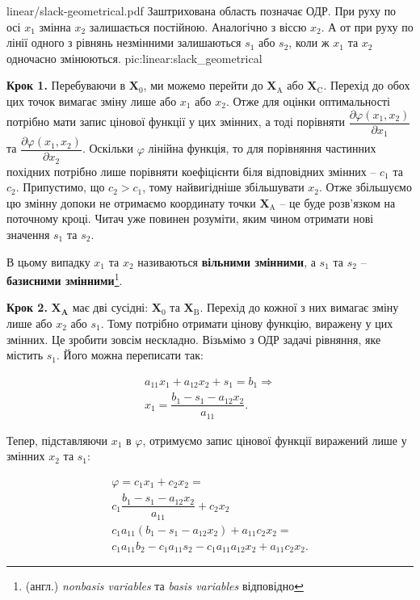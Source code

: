 \documentclass[\main/book.tex]{subfiles}
\begin{document}
\illustration
 {linear/slack-geometrical.pdf}
 {Заштрихована область позначає ОДР. При руху по осі $x_1$ змінна $x_2$ залишається постійною. Аналогічно з віссю $x_2$. А от при руху по лінії одного з рівнянь незмінними залишаються $s_1$ або $s_2$, коли ж $x_1$ та $x_2$ одночасно змінюються.}
 {pic:linear:slack_geometrical}

\textbf{Крок 1.} \quad Перебуваючи в $\mathbf{X}_0$, ми можемо перейти до $\mathbf{X}_\mathrm{A}$ або $\mathbf{X}_\mathrm{C}$. Перехід до обох цих точок вимагає зміну лише або $x_1$ або $x_2$. Отже для оцінки оптимальності потрібно мати запис цінової функції у цих змінних, а тоді порівняти $\dfrac{\partial \varphi(x_1, x_2)}{\partial x_1}$ та $\dfrac{\partial \varphi(x_1, x_2)}{\partial x_2}$. Оскільки $\varphi$ лінійна функція, то для порівняння частинних похідних потрібно лише порівняти коефіцієнти біля відповідних змінних -- $c_1$ та $c_2$. Припустимо, що $c_2 > c_1$, тому найвигідніше збільшувати $x_2$. Отже збільшуємо цю змінну допоки не отримаємо координату точки $\mathbf{X}_\mathrm{A}$ -- це буде розв'язком на поточному кроці. Читач уже повинен розуміти, яким чином отримати нові значення $s_1$ та $s_2$.

В цьому випадку $x_1$ та $x_2$ називаються \textbf{вільними змінними}, а $s_1$ та $s_2$ -- \textbf{базисними змінними}\footnote{(англ.) \textit{nonbasis variables} та \textit{basis variables} відповідно}.

\textbf{Крок 2.}  $\mathbf{X}_\mathbf{A}$ має дві сусідні: $\mathbf{X}_0$ та $\mathbf{X}_\mathrm{B}$. Перехід до кожної з них вимагає зміну лише або $x_2$ або $s_1$. Тому потрібно отримати цінову функцію, виражену у цих змінних. Це зробити зовсім нескладно. Візьмімо з ОДР задачі рівняння, яке містить $s_1$. Його можна переписати так:
 
 \[
 \begin{split}
  a_{11} x_1 + a_{12} x_2 + s_1 = b_1 \Rightarrow \\
  x_1 = \dfrac{b_1 - s_1 - a_{12} x_2}{a_{11}}.
 \end{split}
 \]
 
Тепер, підставляючи $x_1$ в $\varphi$, отримуємо запис цінової функції виражений лише у змінних $x_2$ та $s_1$:
 
\[
  \begin{split}
   \varphi = c_1 x_1 + c_2 x_2 = \\
   c_1 \dfrac{b_1 - s_1 - a_{12} x_2}{a_{11}} + c_2 x_2 \\
   c_1 a_{11} (b_1 - s_1 - a_{12} x_2) + a_{11} c_2 x_2 = \\
   c_1 a_{11} b_2 - c_1 a_{11} s_2 - c_1 a_{11} a_{12} x_2 + a_{11} c_2 x_2.
  \end{split}
\]
\end{document}
